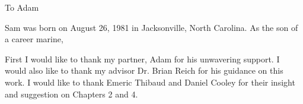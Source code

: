 \maketitlepage

\begin{dedication}
 \centering To Adam
\end{dedication}

\begin{biography}
Sam was born on August 26, 1981 in Jacksonville, North Carolina.
As the son of a career marine, 
\end{biography}

\begin{acknowledgements}
First I would like to thank my partner, Adam for his unwavering support.
I would also like to thank my advisor Dr. Brian Reich for his guidance on this work.
I would like to thank Emeric Thibaud and Daniel Cooley for their insight and suggestion on Chapters 2 and 4.

\end{acknowledgements}


\thesistableofcontents

\thesislistoftables

\thesislistoffigures
